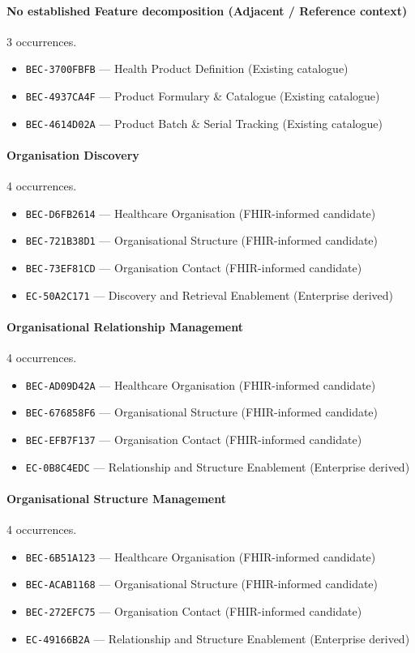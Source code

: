 \documentclass[11pt,a4paper,openany]{book}
\begin{document}
\paragraph{No established Feature decomposition (Adjacent / Reference context)} 3 occurrences.\par
\begin{itemize}
\item \texttt{BEC-3700FBFB} --- Health Product Definition (Existing catalogue)
\item \texttt{BEC-4937CA4F} --- Product Formulary \& Catalogue (Existing catalogue)
\item \texttt{BEC-4614D02A} --- Product Batch \& Serial Tracking (Existing catalogue)
\end{itemize}
\paragraph{Organisation Discovery} 4 occurrences.\par
\begin{itemize}
\item \texttt{BEC-D6FB2614} --- Healthcare Organisation (FHIR-informed candidate)
\item \texttt{BEC-721B38D1} --- Organisational Structure (FHIR-informed candidate)
\item \texttt{BEC-73EF81CD} --- Organisation Contact (FHIR-informed candidate)
\item \texttt{EC-50A2C171} --- Discovery and Retrieval Enablement (Enterprise derived)
\end{itemize}
\paragraph{Organisational Relationship Management} 4 occurrences.\par
\begin{itemize}
\item \texttt{BEC-AD09D42A} --- Healthcare Organisation (FHIR-informed candidate)
\item \texttt{BEC-676858F6} --- Organisational Structure (FHIR-informed candidate)
\item \texttt{BEC-EFB7F137} --- Organisation Contact (FHIR-informed candidate)
\item \texttt{EC-0B8C4EDC} --- Relationship and Structure Enablement (Enterprise derived)
\end{itemize}
\paragraph{Organisational Structure Management} 4 occurrences.\par
\begin{itemize}
\item \texttt{BEC-6B51A123} --- Healthcare Organisation (FHIR-informed candidate)
\item \texttt{BEC-ACAB1168} --- Organisational Structure (FHIR-informed candidate)
\item \texttt{BEC-272EFC75} --- Organisation Contact (FHIR-informed candidate)
\item \texttt{EC-49166B2A} --- Relationship and Structure Enablement (Enterprise derived)
\end{itemize}
\end{document}
